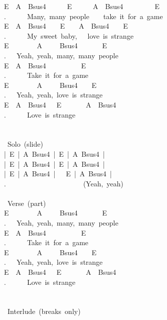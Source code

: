 {E\ \ A\ \ Bsus4\ \ \ \ \ \ E\ \ \ \ \ \ A\ \ Bsus4\ \ \ \ \ \ \ \lbrack\ \ E\ \rbrack\\
.\ \ \ \ \ \ Many,\ many\ people\ \ \ \ take\ it\ for\ a\ game\\
E\ \ A\ \ Bsus4\ \ \ \ E\ \ \ \ A\ \ Bsus4\ \ \lbrack\ \ E\ \rbrack\\
.\ \ \ \ \ \ My\ sweet\ baby,\ \ \ love\ is\ strange\\
E\ \ \ \ \ \ \ \ A\ \ \ \ \ Bsus4\ \ \ \ \ \lbrack\ \ E\ \rbrack\\
.\ \ \ Yeah,\ yeah,\ many,\ many\ people\\
E\ \ A\ \ Bsus4\ \ \ \ \ \ \ \ \lbrack\ \ E\ \rbrack\\
.\ \ \ \ \ \ Take\ it\ for\ a\ game\\
E\ \ \ \ \ \ \ \ A\ \ \ \ \ Bsus4\ \ \lbrack\ \ E\ \rbrack\\
.\ \ \ Yeah,\ yeah,\ love\ is\ strange\\
E\ \ A\ \ Bsus4\ \ \ E\ \ \ \ \ \ \ A\ \ Bsus4\\
.\ \ \ \ \ \ Love\ is\ strange\\
\\
\\
\lbrack\ Solo\rbrack\ (slide)\\
|\ E\ |\ A\ Bsus4\ |\ E\ |\ A\ Bsus4\ |\\
|\ E\ |\ A\ Bsus4\ |\ E\ |\ A\ Bsus4\ |\\
|\ E\ |\ A\ Bsus4\ |\ \lbrack\ \ E\ |\ A\ Bsus4\ |\ \rbrack\\
.\ \ \ \ \ \ \ \ \ \ \ \ \ \ \ \ \ \ \ \ \ \ (Yeah,\ yeah)\\
\\
\lbrack\ Verse\rbrack\ (part)\\
E\ \ \ \ \ \ \ \ A\ \ \ \ \ Bsus4\ \ \ \ \ \lbrack\ \ E\ \rbrack\\
.\ \ \ Yeah,\ yeah,\ many,\ many\ people\\
E\ \ A\ \ Bsus4\ \ \ \ \ \ \ \ \lbrack\ \ E\ \rbrack\\
.\ \ \ \ \ \ Take\ it\ for\ a\ game\\
E\ \ \ \ \ \ \ \ A\ \ \ \ \ Bsus4\ \ \lbrack\ \ E\ \rbrack\\
.\ \ \ Yeah,\ yeah,\ love\ is\ strange\\
E\ \ A\ \ Bsus4\ \ \ E\ \ \ \ \ \ \ A\ \ Bsus4\\
.\ \ \ \ \ \ Love\ is\ strange\\
\\
\\
\lbrack\ Interlude\rbrack\ (breaks\ only)\\
}
